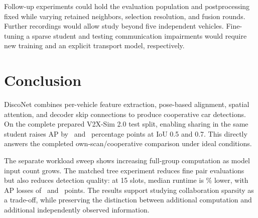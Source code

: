 Follow-up experiments could hold the evaluation population and postprocessing
fixed while varying retained neighbors, selection resolution, and fusion
rounds. Further recordings would allow study beyond five independent
vehicles. Fine-tuning a sparse student and testing communication impairments
would require new training and an explicit transport model, respectively.

\section{Conclusion}
DiscoNet combines per-vehicle feature extraction, pose-based alignment,
spatial attention, and decoder skip connections to produce cooperative car
detections. On the complete prepared V2X-Sim 2.0 test split, enabling sharing
in the same student raises AP by \ReportGainFifty\ and \ReportGainSeventy\
percentage points at IoU 0.5 and 0.7. This directly answers the completed
own-scan/cooperative comparison under ideal conditions.

The separate workload sweep shows increasing full-group computation as
model input count grows. The matched tree experiment reduces fine pair
evaluations but also reduces detection quality: at 15 slots, median runtime
is \ReportTreeReduction\% lower, with AP losses of \ReportTreeDropFifty\ and
\ReportTreeDropSeventy\ points. The results support studying collaboration
sparsity as a trade-off, while preserving the distinction between additional
computation and additional independently observed information.
